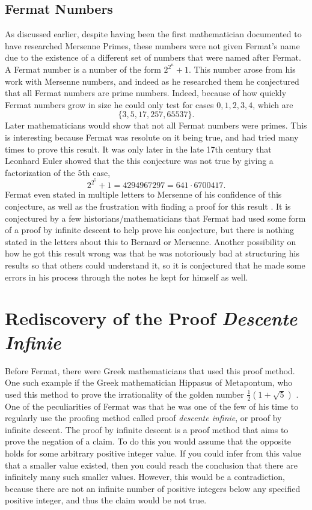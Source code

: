 \documentclass[11pt]{article}
\begin{document}
\subsection*{Fermat Numbers}
As discussed earlier, despite having been the first mathematician documented to
have researched Mersenne Primes, these numbers were not given Fermat's name due to the existence
of a different set of numbers that were named after Fermat.
A Fermat number is a number of the form $2^{2^n} +1$.
This number arose from his work with Mersenne numbers, and indeed as he
researched them he conjectured that all Fermat numbers are prime numbers.
Indeed, because of how quickly Fermat numbers grow in size he could only
test for cases $0,1,2,3,4$, which are
    \[\{3, 5, 17, 257, 65537\}. \]
Later mathematicians would show that not all Fermat numbers were primes.
This is interesting because Fermat was resolute on it being true,
and had tried many times to prove this result.
It was only later in the late 17th century that Leonhard Euler showed that the
this conjecture was not true by giving a factorization of the 5th case,
    \[2^{2^5}+1 = 4294967297 = 641 \cdot 6700417. \]
Fermat even stated in multiple letters to Mersenne of his confidence of this
conjecture, as well as the frustration with finding a proof for
this result \cite{Mahoney, Ball}.
It is conjectured by a few historians/mathematicians that Fermat had used some
form of a proof by infinite descent to help prove his conjecture, but there is
nothing stated in the letters about this to Bernard or Mersenne.
Another possibility on how he got this result wrong was that he was notoriously
bad at structuring his results so that others could understand it,
so it is conjectured that he made some errors in his process through the
notes he kept for himself as well.


\section*{Rediscovery of the Proof \emph{Descente Infinie}}
Before Fermat, there were Greek mathematicians that used this proof method.
One such example if the Greek mathematician Hippasus of Metapontum, who
used this method to prove the irrationality of the golden number
$\frac{1}{2}(1+\sqrt{5})$ \cite{Wirth}.
One of the peculiarities of Fermat was that he was one of the few of his time
to regularly use the proofing method called proof \emph{descente infinie}, or
proof by infinite descent.
The proof by infinite descent is a proof method that aims to prove the negation
of a claim.
To do this you would assume that the opposite holds for some arbitrary
positive integer value.
If you could infer from this value that a smaller value existed, then you could
reach the conclusion that there are infinitely many such smaller values.
However, this would be a contradiction, because there are not an infinite number
of positive integers below any specified positive integer, and thus the claim
would be not true.
\end{document}
